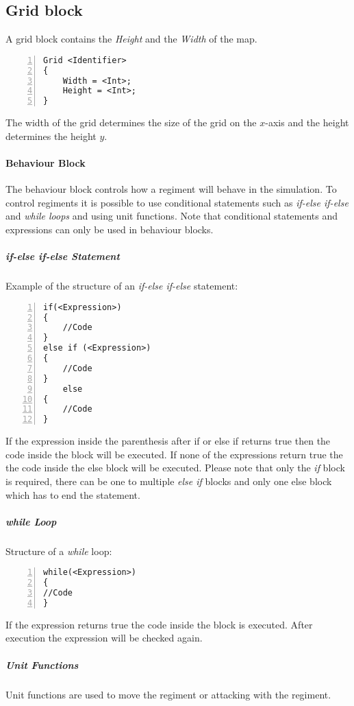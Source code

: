 	\subsection{Grid block}
		A grid block contains the {\it Height} and the {\it Width }of the map.

		\begin{lstlisting}[basicstyle=\small\sffamily,
		keywordstyle={\color{blue}},
		comment={[l]{//}}, morecomment={[s]{/*}{*/}}, commentstyle=\itshape,
		columns={[l]flexible}, numbers=left, numberstyle=\tiny,
		frameround=fftt, frame=shadowbox, captionpos=b,
		caption={Grid Block}]
Grid <Identifier>
{
	Width = <Int>;
	Height = <Int>;
}
		\end{lstlisting}	
		The width of the grid determines the size of the grid on the $x$-axis and the height determines the height $y$.
	\paragraph{Behaviour Block}
		The behaviour block controls how a regiment will behave in the simulation. To control regiments it is possible to 
		use conditional statements such as {\it if-else if-else} and {\it while loops} and using unit functions. Note that 
		conditional statements and expressions can only be used in behaviour blocks.
		\subparagraph{if-else if-else Statement} Example of the structure of an {\it if-else if-else} statement:

		\begin{lstlisting}[basicstyle=\small\sffamily,
		keywordstyle={\color{blue}},
		comment={[l]{//}}, morecomment={[s]{/*}{*/}}, commentstyle=\itshape,
		columns={[l]flexible}, numbers=left, numberstyle=\tiny,
		frameround=fftt, frame=shadowbox, captionpos=b,
		caption={if and else if statements}]
if(<Expression>)
{
	//Code
}
else if (<Expression>)
{
	//Code
}
	else
{
	//Code
}
			\end{lstlisting}
			If the expression inside the parenthesis after if or else if returns true then the code inside the block will be executed.
			If none of the expressions return true the the code inside the else block will be executed. Please note that only the \textit{if} block is required, there can be one to multiple \textit{else if }blocks and only one else block which has to end the statement. \\
		\subparagraph{while Loop}
			Structure of a {\it while} loop: \\			

		\begin{lstlisting}[basicstyle=\small\sffamily,
		keywordstyle={\color{blue}},
		comment={[l]{//}}, morecomment={[s]{/*}{*/}}, commentstyle=\itshape,
		columns={[l]flexible}, numbers=left, numberstyle=\tiny,
		frameround=fftt, frame=shadowbox, captionpos=b,
		caption={While loop}]
while(<Expression>)
{
//Code
}
			\end{lstlisting}
			If the expression returns true the code inside the block is executed. After execution the expression will be checked again.
		\subparagraph{Unit Functions}
			Unit functions are used to move the regiment or attacking with the regiment.


